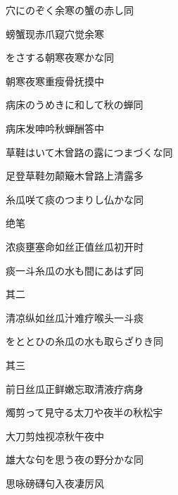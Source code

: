 \begin{haiku}
    {\FH 穴にのぞく余寒の蟹の赤し}\hfill{\FH 同}

    {\FK 螃蟹现赤爪窥穴觉余寒}
\end{haiku}

\begin{haiku}
    {\FH {}をさする朝寒夜寒かな}\hfill{\FH 同}

    {\FK 朝寒夜寒重瘦骨抚摸中}
\end{haiku}

\begin{haiku}
    {\FH 病床のうめきに和して秋の蝉}\hfill{\FH 同}

    {\FK 病床发呻吟秋蝉酬答中}
\end{haiku}

\begin{haiku}
    {\FH 草鞋はいて木曾路の露につまづくな}\hfill{\FH 同}

    {\FK 足登草鞋勿颠簸木曾路上清露多}
\end{haiku}

\begin{haiku}
    {\FH 糸瓜咲て痰のつまりし仏かな}\hfill{\FH 同}

    {\FK 绝笔}

    {\FK 浓痰壅塞命如丝正值丝瓜初开时}
\end{haiku}

\begin{haiku}
    {\FH 痰一斗糸瓜の水も間にあはず}\hfill{\FH 同}

    {\FK 其二}

    {\FK 清凉纵如丝瓜汁难疗喉头一斗痰}
\end{haiku}

\begin{haiku}
    {\FH をととひの糸瓜の水も取らざりき}\hfill{\FH 同}

    {\FK 其三}

    {\FK 前日丝瓜正鲜嫩忘取清液疗病身}
\end{haiku}

\begin{haiku}
    {\FH 燭剪って見守る太刀や夜半の秋}\hfill{\FH 松宇}

    {\FK 大刀剪烛视凉秋午夜中}
\end{haiku}

\begin{haiku}
    {\FH 雄大な句を思う夜の野分かな}\hfill{\FH 同}

    {\FK 思咏磅礴句入夜凄厉风}
\end{haiku}


